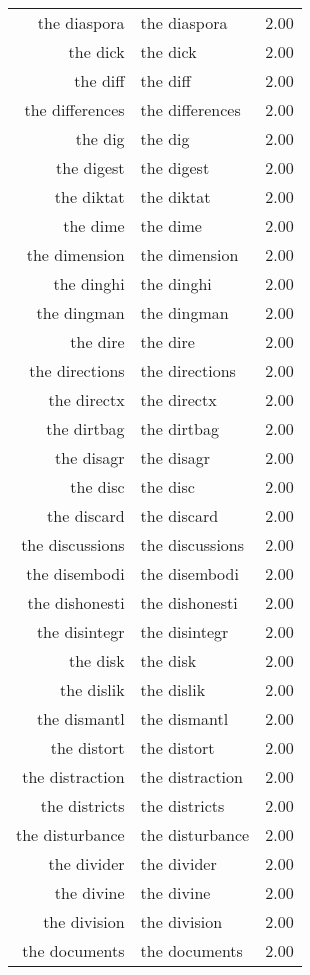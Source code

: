 \begin{table}[ht]
\begin{tabular}{rlr}
  the diaspora & the diaspora & 2.00 \\ 
  the dick & the dick & 2.00 \\ 
  the diff & the diff & 2.00 \\ 
  the differences & the differences & 2.00 \\ 
  the dig & the dig & 2.00 \\ 
  the digest & the digest & 2.00 \\ 
  the diktat & the diktat & 2.00 \\ 
  the dime & the dime & 2.00 \\ 
  the dimension & the dimension & 2.00 \\ 
  the dinghi & the dinghi & 2.00 \\ 
  the dingman & the dingman & 2.00 \\ 
  the dire & the dire & 2.00 \\ 
  the directions & the directions & 2.00 \\ 
  the directx & the directx & 2.00 \\ 
  the dirtbag & the dirtbag & 2.00 \\ 
  the disagr & the disagr & 2.00 \\ 
  the disc & the disc & 2.00 \\ 
  the discard & the discard & 2.00 \\ 
  the discussions & the discussions & 2.00 \\ 
  the disembodi & the disembodi & 2.00 \\ 
  the dishonesti & the dishonesti & 2.00 \\ 
  the disintegr & the disintegr & 2.00 \\ 
  the disk & the disk & 2.00 \\ 
  the dislik & the dislik & 2.00 \\ 
  the dismantl & the dismantl & 2.00 \\ 
  the distort & the distort & 2.00 \\ 
  the distraction & the distraction & 2.00 \\ 
  the districts & the districts & 2.00 \\ 
  the disturbance & the disturbance & 2.00 \\ 
  the divider & the divider & 2.00 \\ 
  the divine & the divine & 2.00 \\ 
  the division & the division & 2.00 \\ 
  the documents & the documents & 2.00 \\ 

\end{tabular}
\end{table}

